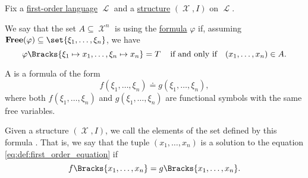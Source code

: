 \begin{definition}\label{def:first_order_definability}
  Fix a \hyperref[def:first_order_syntax]{first-order language} \( \mscrL \) and a \hyperref[def:first_order_structure]{structure} \( (\mscrX, I) \) on \( \mscrL \).

  We say that the set \( A \subseteq \mscrX^n \) is  using the \hyperref[def:first_order_syntax]{formula} \( \varphi \) if, assuming \( {\boldop{Free}(\varphi) \subseteq \set{ \xi_1, \ldots, \xi_n }} \), we have
  \begin{equation*}
    \varphi\Bracks{\xi_1 \mapsto x_1, \ldots, \xi_n \mapsto x_n} = T \quad\T{if and only if}\quad (x_1, \ldots, x_n) \in A.
  \end{equation*}
\end{definition}

\begin{definition}\label{def:first_order_equation}
  A  is a formula of the form
  \begin{equation}\label{eq:def:first_order_equation}
    f(\xi_1, \ldots, \xi_n) \doteq g(\xi_1, \ldots, \xi_n),
  \end{equation}
  where both \( f(\xi_1, \ldots, \xi_n) \) and \( g(\xi_1, \ldots, \xi_n) \) are functional symbols with the same free variables.

  Given a structure \( (\mscrX, I) \), we call the elements of the set defined by this formula . That is, we say that the tuple \( (x_1, \ldots, x_n) \) is a solution to the equation \eqref{eq:def:first_order_equation} if
  \begin{equation*}
    f\Bracks{x_1, \ldots, x_n} = g\Bracks{x_1, \ldots, x_n}.
  \end{equation*}
\end{definition}

